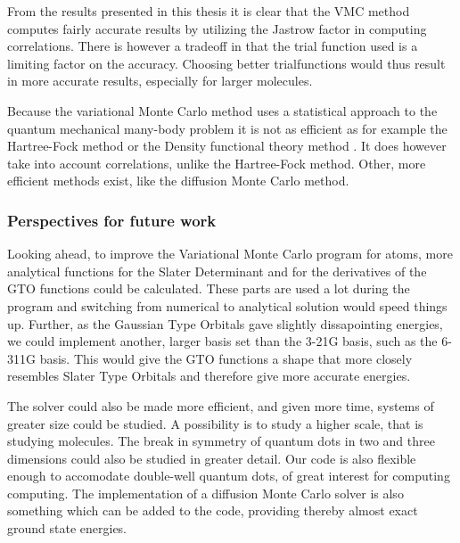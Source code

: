 From the results presented in this thesis it is clear that the VMC
method computes fairly accurate results by utilizing the Jastrow
factor in computing correlations. There is however a tradeoff in that
the trial function used is a limiting factor on the accuracy. Choosing
better trialfunctions would thus result in more accurate results,
especially for larger molecules.

Because the variational Monte Carlo method uses a statistical approach
to the quantum mechanical many-body problem it is not as efficient as
for example the Hartree-Fock method or the Density functional theory
method \cite{kohn1965self}. It does however take into account
correlations, unlike the Hartree-Fock method. Other, more efficient
methods exist, like the diffusion Monte Carlo method.

\subsubsection{Perspectives for future work}
Looking ahead, to improve the Variational Monte Carlo program for
atoms, more analytical functions for the Slater Determinant and for
the derivatives of the GTO functions could be calculated. These parts
are used a lot during the program and switching from numerical to
analytical solution would speed things up. Further, as the Gaussian
Type Orbitals gave slightly dissapointing energies, we could implement
another, larger basis set than the 3-21G basis, such as the 6-311G
basis. This would give the GTO functions a shape that more closely
resembles Slater Type Orbitals and therefore give more accurate
energies.

The solver could also be made more efficient, and given more time,
systems of greater size could be studied. A possibility is to study a
higher scale, that is studying molecules. The break in symmetry of
quantum dots in two and three dimensions could also be studied in
greater detail. Our code is also flexible enough to accomodate double-well 
quantum dots, of great interest for computing computing. The implementation of a
diffusion Monte Carlo solver is also something which can be added to the code, providing
thereby almost exact ground state energies. 
